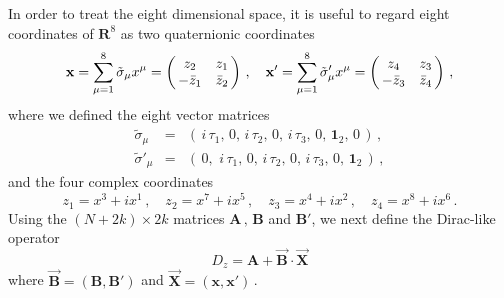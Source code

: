 \documentclass[a4paper,12pt]{article}
\begin{document}
In order to treat the eight dimensional space, it is useful to regard 
eight coordinates of $\mathbf{R}^8$ as two  
quaternionic coordinates 
\begin{equation}
\mathbf{x}=\sum_{\mu =1}^8 \tilde{\sigma}_{\mu}x^{\mu}=
\left( \begin{array}{@{\,}cc@{\,}}
   z_2 & z_1\\
  -\bar{z}_1  &  \bar{z}_2
  \end{array}  \right)\,,\quad 
\mathbf{x}'=\sum_{\mu =1}^8 \tilde{\sigma}'_{\mu}x^{\mu}=
\left( \begin{array}{@{\,}cc@{\,}}
   z_4 & z_3\\
  -\bar{z}_3  &  \bar{z}_4
  \end{array}  \right)\,,
\end{equation}
where we defined the eight vector matrices
\begin{eqnarray}
\tilde{\sigma}_{\mu}&=&(\,i\,\tau_1,\,0,\,i\,\tau_2,\,0,\,i\,\tau_3,\,0,\,\textbf{1}_2,\,0\,)\,,\\
\tilde{\sigma}'_{\mu}&=&(\,0,\,\,i\,\tau_1,\,0,\,i\,\tau_2,\,0,\,i\,\tau_3,\,0,\,\textbf{1}_2\,)\,,
\end{eqnarray}
and the four complex coordinates
\begin{equation}
 z_1=x^3+ix^1\,,\quad z_2=x^7+ix^5\,,\quad 
z_3=x^4+ix^2\,,\quad z_4=x^8+ix^6\,.
\end{equation}
Using the $(N+2k)\times 2k$ matrices $\mathbf{A}\,,\,\mathbf{B}$ 
and $\mathbf{B}'$, we next define 
the Dirac-like operator 
\begin{equation}
D_z = \textbf{A}+\overrightarrow{\mathbf{B}}\cdot \overrightarrow
{\mathbf{X}}
\end{equation}
where  $\overrightarrow{\mathbf{B}}=(\mathbf{B},\mathbf{B}')$ and  
$\overrightarrow{\mathbf{X}}=(\mathbf{x},\mathbf{x}')$\,. 
\end{document}
